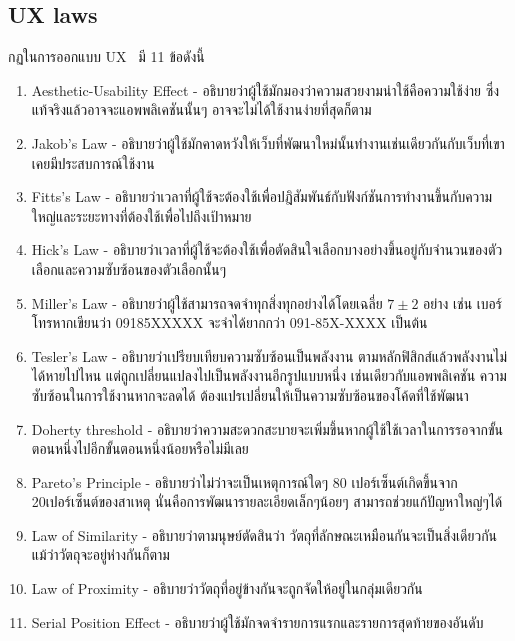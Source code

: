 \subsection{UX laws}
กฏในการออกแบบ UX~\cite{uxui} มี 11 ข้อดังนี้
\begin{enumerate}
  \item Aesthetic-Usability Effect - อธิบายว่าผู้ใช้มักมองว่าความสวยงามน่าใช้คือความใช้ง่าย 
      ซึ่งแท้จริงแล้วอาจจะแอพพลิเคชันนั้นๆ อาจจะไม่ได้ใช้งานง่ายที่สุดก็ตาม 
  \item Jakob's Law - อธิบายว่าผู้ใช้มักคาดหวังให้เว็บที่พัฒนาใหม่นั้นทำงานเช่นเดียวกันกับเว็บที่เขาเคยมีประสบการณ์ใช้งาน
  \item Fitts's Law - อธิบายว่าเวลาที่ผู้ใช้จะต้องใช้เพื่อปฎิสัมพันธ์กับฟังก์ชันการทำงานขึ้นกับความใหญ่และระยะทางที่ต้องใช้เพื่อไปถึงเป้าหมาย
  \item Hick's Law - อธิบายว่าเวลาที่ผู้ใช้จะต้องใช้เพื่อตัดสินใจเลือกบางอย่างขึ้นอยู่กับจำนวนของตัวเลือกและความซับซ้อนของตัวเลือกนั้นๆ
  \item Miller's Law - อธิบายว่าผู้ใช้สามารถจดจำทุกสิ่งทุกอย่างได้โดยเฉลี่ย $7\pm2$ อย่าง 
        เช่น เบอร์โทรหากเขียนว่า 09185XXXXX จะจำได้ยากกว่า 091-85X-XXXX เป็นต้น
  \item Tesler's Law - อธิบายว่าเปรียบเทียบความซับซ้อนเป็นพลังงาน ตามหลักฟิสิกส์แล้วพลังงานไม่ได้หายไปไหน 
        แต่ถูกเปลี่ยนแปลงไปเป็นพลังงานอีกรูปแบบหนึ่ง เช่นเดียวกับแอพพลิเคชัน ความซับซ้อนในการใช้งานหากจะลดได้ 
        ต้องแปรเปลี่ยนให้เป็นความซับซ้อนของโค้ดที่ใช้พัฒนา
  \item Doherty threshold - อธิบายว่าความสะดวกสะบายจะเพิ่มขึ้นหากผู้ใช้ใช้เวลาในการรอจากขั้นตอนหนึ่งไปอีกขั้นตอนหนึ่งน้อยหรือไม่มีเลย
  \item Pareto's  Principle - อธิบายว่าไม่ว่าจะเป็นเหตุการณ์ใดๆ 80 เปอร์เซ็นต์เกิดขึ้นจาก 20เปอร์เซ็นต์ของสาเหตุ นั่นคือการพัฒนารายละเอียดเล็กๆน้อยๆ สามารถช่วยแก้ปัญหาใหญ่ๆได้
  \item Law of Similarity - อธิบายว่าตามนุษย์ตัดสินว่า วัตถุที่ลักษณะเหมือนกันจะเป็นสิ่งเดียวกัน แม้ว่าวัตถุจะอยู่ห่างกันก็ตาม
  \item Law of Proximity - อธิบายว่าวัตถุที่อยู่ข้างกันจะถูกจัดให้อยู่ในกลุ่มเดียวกัน
  \item Serial Position Effect - อธิบายว่าผู้ใช้มักจดจำรายการแรกและรายการสุดท้ายของอันดับ
\end{enumerate}

